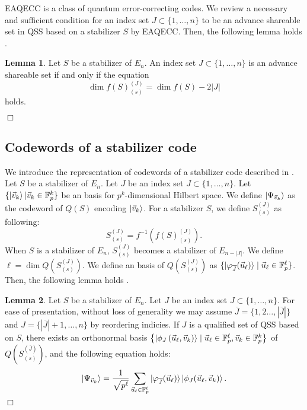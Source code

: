 \documentclass[11pt,a4paper]{article}
\theoremstyle{definition}
\newtheorem{lemma}{Lemma}
\begin{document}
EAQECC\cite{EAQECC_Brun_2006} is a class of quantum error-correcting codes.
We review a necessary and sufficient condition for an index set $J\subset\{1,\dots,n\}$ 
to be an advance shareable set 
in QSS based on a stabilizer $S$ by EAQECC\cite{AdvanceSharing_Shibata}. 
Then, the following lemma holds \cite{AdvanceSharing_Shibata}.
\begin{lemma}\label{junbi}
    Let $S$ be a stabilizer of ${E_{n}}$. 
    An index set $J\subset\{1,\dots,n\}$ is an advance shareable set 
    if and only if the equation
    \begin{equation}\label{4}
        \dim{f(S)_{(s)}^{(J)}}=\dim{f(S)}-2|J|
    \end{equation}
    holds.
\end{lemma}\hfill$\Box$


\subsection{Codewords of a stabilizer code}
We introduce the representation of codewords of a stabilizer code described in \cite{Unitary_reconstruction_Matsumoto_2017}.
Let $S$ be a stabilizer of $E_n$. 
Let $J$ be an index set $J\subset\{1,\dots,n\}$.
Let $\{\ket{\vec{v}_k}|\vec{v}_k\in\mathbb{F}_p^k\}$ be an  basis for $p^k$-dimensional Hilbert space.
We define $\ket{\Psi_{\vec{v}_k}}$ as the codeword of $Q(S)$ encoding $\ket{\vec{v}_k}$.
For a stabilizer $S$, we define $S_{(s)}^{(J)}$ as following:
\begin{equation}
    S_{(s)}^{(J)} = f^{-1}\left( f(S)_{(s)}^{(J)}\right).
\end{equation}
When $S$ is a stabilizer of $E_n$, $S_{(s)}^{(J)}$ becomes a stabilizer of $E_{n-|J|}$.
We define $\ell = \dim{Q\left(S_{(s)}^{(J)}\right)}$. 
We define an basis of $Q\left(S_{(s)}^{(J)}\right)$ as $\{\ket{\varphi_{\overline{J}}(\vec{u}_\ell)} \mid \vec{u}_\ell \in \mathbb{F}_p^\ell\}$.
Then, the following lemma holds \cite{Unitary_reconstruction_Matsumoto_2017}.
\begin{lemma}\label{Proving}
    Let $S$ be a stabilizer of $E_n$. 
    Let $J$ be an index set $J\subset\{1,\dots,n\}$.
    For ease of presentation, without loss of generality we may assume $\overline{J} = \{1,2\dots,|\overline{J}|\}$ and $J =\{|\overline{J}|+1,\dots,n\}$ by reordering indicies.
    If $J$ is a qualified set of QSS based on $S$, there exists an orthonormal basis $\left\{\ket{\phi_J\left(\vec{u}_\ell, \vec{v}_k\right)} \mid \vec{u}_\ell \in \mathbb{F}_p^\ell, \vec{v}_k \in \mathbb{F}_p^k\right\}$ of 
    $Q\left(S_{(s)}^{(\overline{J})}\right)$, and the following equation holds:
    \begin{equation}
        \ket{\Psi_{\vec{v}_k}} = \frac{1}{\sqrt{p^\ell}}\sum_{\vec{u}_\ell\in\mathbb{F}_p^\ell}\ket{\varphi_{\overline{J}}(\vec{u}_\ell)}\ket{\phi_J(\vec{u}_\ell,\vec{v}_k)}.
    \end{equation}
    \hfill$\Box$
\end{lemma}
\end{document}
